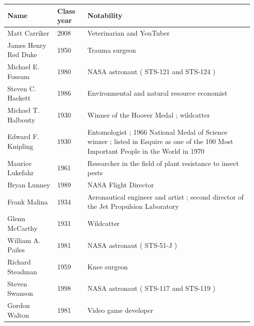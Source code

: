 \documentclass{article}
\begin{document}
\begin{tabular}{lll}
\toprule
Name & Class year & Notability \\
\midrule
Matt Carriker & 2008 & Veterinarian and YouTuber \\
James Henry Red Duke & 1950 & Trauma surgeon \\
Michael E. Fossum & 1980 & NASA astronaut ( STS-121 and STS-124 ) \\
Steven C. Hackett & 1986 & Environmental and natural resource economist \\
Michael T. Halbouty & 1930 & Winner of the Hoover Medal ; wildcatter \\
Edward F. Knipling & 1930 & Entomologist ; 1966 National Medal of Science winner ; listed in Esquire as one of the 100 Most Important People in the World in 1970 \\
Maurice Lukefahr & 1961 & Researcher in the field of plant resistance to insect pests \\
Bryan Lunney & 1989 & NASA Flight Director \\
Frank Malina & 1934 & Aeronautical engineer and artist ; second director of the Jet Propulsion Laboratory \\
Glenn McCarthy & 1931 & Wildcatter \\
William A. Pailes & 1981 & NASA astronaut ( STS-51-J ) \\
Richard Steadman & 1959 & Knee surgeon \\
Steven Swanson & 1998 & NASA astronaut ( STS-117 and STS-119 ) \\
Gordon Walton & 1981 & Video game developer \\
\bottomrule
\end{tabular}
\end{document}
